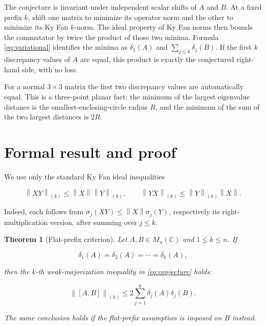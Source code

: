 \documentclass[11pt]{article}
\newtheorem{theorem}{Theorem}
\newcommand{\C}{\mathbb C}
\newcommand{\M}{M}
\newcommand{\norm}[1]{\left\lVert #1\right\rVert}
\begin{document}
The conjecture is invariant under independent scalar shifts of \(A\) and
\(B\).  At a fixed prefix \(k\), shift one matrix to minimize its operator
norm and the other to minimize its Ky Fan \(k\)-norm.  The ideal property of
Ky Fan norms then bounds the commutator by twice the product of those two
minima.  Formula \eqref{eq:variational} identifies the minima as
\(\delta_1(A)\) and \(\sum_{j\leq k}\delta_j(B)\).  If the first \(k\)
discrepancy values of \(A\) are equal, this product is exactly the conjectured
right-hand side, with no loss.

For a normal \(3\times3\) matrix the first two discrepancy values are
automatically equal.  This is a three-point planar fact: the minimum of the
largest eigenvalue distance is the smallest-enclosing-circle radius \(R\),
and the minimum of the sum of the two largest distances is \(2R\).

\section*{Formal result and proof}

We use only the standard Ky Fan ideal inequalities

\begin{equation}
 \norm{XY}_{(k)}\leq \norm{X}\norm{Y}_{(k)},\qquad
 \norm{YX}_{(k)}\leq \norm{Y}_{(k)}\norm{X}.
 \label{eq:ideal}
\end{equation}

Indeed, each follows from
\(\sigma_j(XY)\leq\norm{X}\sigma_j(Y)\), respectively its right-multiplication
version, after summing over \(j\leq k\).

\begin{theorem}[Flat-prefix criterion]
\label{thm:flat}
Let \(A,B\in\M_n(\C)\) and \(1\leq k\leq n\).  If

\[
  \delta_1(A)=\delta_2(A)=\cdots=\delta_k(A),
\]

then the \(k\)-th weak-majorization inequality in
\eqref{eq:conjecture} holds:

\[
 \norm{[A,B]}_{(k)}
 \leq 2\sum_{j=1}^k\delta_j(A)\delta_j(B).
\]

The same conclusion holds if the flat-prefix assumption is imposed on \(B\)
instead.
\end{theorem}
\end{document}
